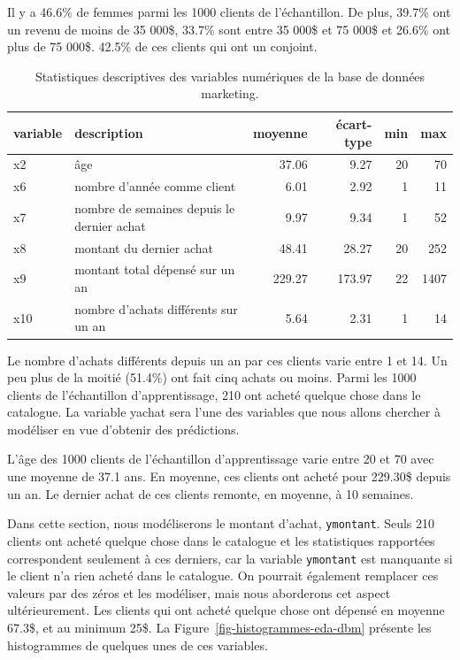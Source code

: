 \documentclass[
  11pt,
  letterpaper,
]{scrbook}
\theoremstyle{definition}
\theoremstyle{remark}
\begin{document}
Il y a 46.6\% de femmes parmi les 1000 clients de l'échantillon. De
plus, 39.7\% ont un revenu de moins de 35 000\$, 33.7\% sont entre 35
000\$ et 75 000\$ et 26.6\% ont plus de 75 000\$. 42.5\% de ces clients
qui ont un conjoint.

\hypertarget{tbl-statdescript-dbm}{}
\begin{table}
\caption{\label{tbl-statdescript-dbm}Statistiques descriptives des variables numériques de la base de données
marketing. }\tabularnewline

\centering
\begin{tabular}{llrrrr}
\toprule
variable & description & moyenne & écart-type & min & max\\
\midrule
x2 & âge & 37.06 & 9.27 & 20 & 70\\
x6 & nombre d’année comme client & 6.01 & 2.92 & 1 & 11\\
x7 & nombre de semaines depuis le dernier achat & 9.97 & 9.34 & 1 & 52\\
x8 & montant du dernier achat & 48.41 & 28.27 & 20 & 252\\
x9 & montant total dépensé sur un an & 229.27 & 173.97 & 22 & 1407\\
x10 & nombre d'achats différents sur un an & 5.64 & 2.31 & 1 & 14\\
\bottomrule
\end{tabular}
\end{table}

Le nombre d'achats différents depuis un an par ces clients varie entre 1
et 14. Un peu plus de la moitié (51.4\%) ont fait cinq achats ou moins.
Parmi les 1000 clients de l'échantillon d'apprentissage, 210 ont acheté
quelque chose dans le catalogue. La variable yachat sera l'une des
variables que nous allons chercher à modéliser en vue d'obtenir des
prédictions.

L'âge des 1000 clients de l'échantillon d'apprentissage varie entre 20
et 70 avec une moyenne de 37.1 ans. En moyenne, ces clients ont acheté
pour 229.30\$ depuis un an. Le dernier achat de ces clients remonte, en
moyenne, à 10 semaines.

Dans cette section, nous modéliserons le montant d'achat,
\texttt{ymontant}. Seuls 210 clients ont acheté quelque chose dans le
catalogue et les statistiques rapportées correspondent seulement à ces
derniers, car la variable \texttt{ymontant} est manquante si le client
n'a rien acheté dans le catalogue. On pourrait également remplacer ces
valeurs par des zéros et les modéliser, mais nous aborderons cet aspect
ultérieurement. Les clients qui ont acheté quelque chose ont dépensé en
moyenne 67.3\$, et au minimum 25\$. La
Figure~\ref{fig-histogrammes-eda-dbm} présente les histogrammes de
quelques unes de ces variables.
\end{document}
